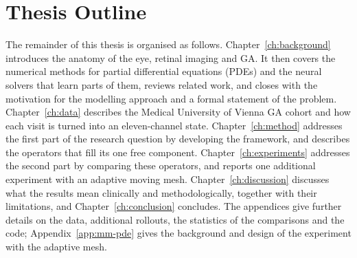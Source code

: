 \section{Thesis Outline}
\label{sec:introduction:outline}

The remainder of this thesis is organised as follows.
Chapter~\ref{ch:background} introduces the anatomy of the eye, retinal
imaging and GA. It then covers the numerical methods for partial
differential equations (PDEs) and the neural solvers that learn parts of
them, reviews related work, and closes with the motivation for the
modelling approach and a formal statement of the problem.
Chapter~\ref{ch:data} describes the Medical University of Vienna GA cohort
and how each visit is turned into an eleven-channel state.
Chapter~\ref{ch:method} addresses the first part of the research question
by developing the framework, and describes the operators that fill its one
free component. Chapter~\ref{ch:experiments} addresses the second part by
comparing these operators, and reports one additional experiment with an
adaptive moving mesh. Chapter~\ref{ch:discussion} discusses what the
results mean clinically and methodologically, together with their
limitations, and Chapter~\ref{ch:conclusion} concludes. The appendices give
further details on the data, additional rollouts, the statistics of the
comparisons and the code; Appendix~\ref{app:mm-pde} gives the background
and design of the experiment with the adaptive mesh.



